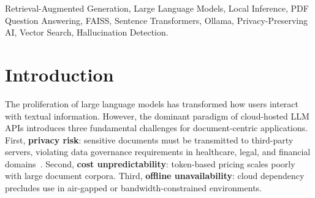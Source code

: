\documentclass[conference]{IEEEtran}
\begin{document}
\begin{abstract}
Large Language Models (LLMs) have demonstrated remarkable capability in
natural language understanding and generation, yet their deployment in
document-centric question answering remains constrained by privacy risks,
API costs, and cloud dependency.
This paper presents \textbf{DocMind AI}, a fully local,
privacy-preserving Retrieval-Augmented Generation (RAG) system for
intelligent PDF document question answering.
The system integrates PyMuPDF for page-aware text extraction, a
character-level overlapping chunking strategy, dense vector embeddings
via the \texttt{all-MiniLM-L6-v2} sentence transformer ($d{=}384$),
FAISS-based exact nearest-neighbour retrieval, Ollama-hosted LLaMA~3.2
inference, and an automated hallucination verification module --- all
executing on commodity hardware without any external API calls.
A production-grade React/TypeScript frontend provides a dual-pane
workspace with real-time PDF rendering, automatic source-chunk
highlighting via canvas overlay, streaming answer reveal, key-point
extraction, follow-up question suggestion, and a canvas-based
particle-network animation during document indexing.
Evaluation on 50 questions across 10 diverse PDF documents yields 76\%
fully correct responses with sub-second retrieval latency ($<$10\,ms
FAISS search) and a total memory footprint of approximately 2.5\,GB.
DocMind AI establishes a practical, reproducible blueprint for deploying
enterprise-grade RAG pipelines entirely on-premises.
\end{abstract}

\begin{IEEEkeywords}
Retrieval-Augmented Generation, Large Language Models, Local Inference,
PDF Question Answering, FAISS, Sentence Transformers, Ollama,
Privacy-Preserving AI, Vector Search, Hallucination Detection.
\end{IEEEkeywords}

\section{Introduction}

The proliferation of large language models has transformed how users
interact with textual information.
However, the dominant paradigm of cloud-hosted LLM APIs introduces three
fundamental challenges for document-centric applications.
First, \textbf{privacy risk}: sensitive documents must be transmitted to
third-party servers, violating data governance requirements in healthcare,
legal, and financial domains~\cite{lewis2020rag}.
Second, \textbf{cost unpredictability}: token-based pricing scales poorly
with large document corpora.
Third, \textbf{offline unavailability}: cloud dependency precludes use in
air-gapped or bandwidth-constrained environments.
\end{document}
